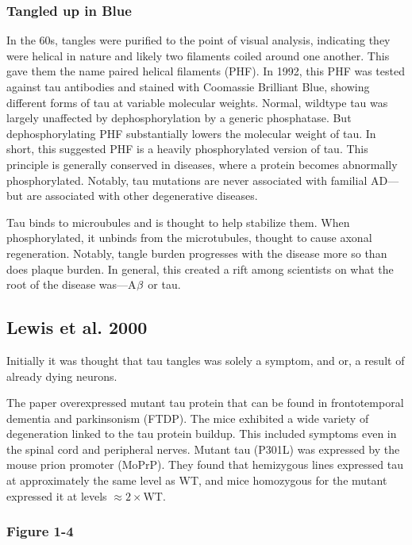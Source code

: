 \subsubsection*{Tangled up in Blue}

 In the 60s, tangles were purified to the point of visual analysis, indicating they were helical in nature and likely two filaments coiled around one another. This gave them the name paired helical filaments (PHF). In 1992, this PHF was tested against tau antibodies and stained with Coomassie Brilliant Blue, showing different forms of tau at variable molecular weights. Normal, wildtype tau was largely unaffected by dephosphorylation by a generic phosphatase. But dephosphorylating PHF substantially lowers the molecular weight of tau. In short, this suggested PHF is a heavily phosphorylated version of tau. This principle is generally conserved in diseases, where a protein becomes abnormally phosphorylated. Notably, tau mutations are never associated with familial AD---but are associated with other degenerative diseases.\newline

 Tau binds to microubules and is thought to help stabilize them. When phosphorylated, it unbinds from the microtubules, thought to cause axonal regeneration. Notably, tangle burden progresses with the disease more so than does plaque burden. In general, this created a rift among scientists on what the root of the disease was---A$\beta$ or tau. 

 \subsection*{Lewis et al. 2000}

 Initially it was thought that tau tangles was solely a symptom, and or, a result of already dying neurons.\newline

 The paper overexpressed mutant tau protein that can be found in frontotemporal dementia and parkinsonism (FTDP). The mice exhibited a wide variety of degeneration linked to the tau protein buildup. This included symptoms even in the spinal cord and peripheral nerves. Mutant tau (P301L) was expressed by the mouse prion promoter (MoPrP). They found that hemizygous lines expressed tau at approximately the same level as WT, and mice homozygous for the mutant expressed it at levels $\approx 2\times$WT.  

 \subsubsection*{Figure 1-4}

